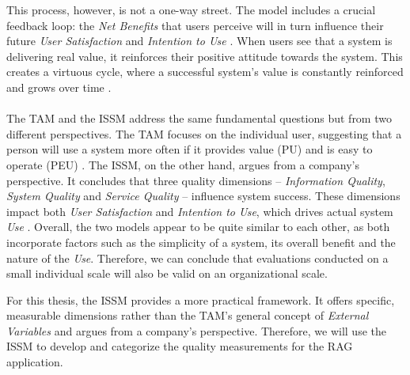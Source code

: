 \documentclass[
	english,
	ruledheaders=section,%
	class=report,%
	thesis={type=bachelor},%
	accentcolor=1b,%
	custommargins=true,%
	marginpar=false,%
	parskip=half-,%
	fontsize=11pt,%
	DIV=14,
]{tudapub}
\begin{document}
This process, however, is not a one-way street. The model includes a crucial feedback loop: the \textit{Net Benefits} that users perceive will in turn influence their future \textit{User Satisfaction} and \textit{Intention to Use} \parencite[p.~23-24]{DeloneMcLean2003ISSuccessTenYearUpdate}. When users see that a system is delivering real value, it reinforces their positive attitude towards the system. This creates a virtuous cycle, where a successful system's value is constantly reinforced and grows over time \parencite[p.~23]{DeloneMcLean2003ISSuccessTenYearUpdate}.\\
\\
The TAM and the ISSM address the same fundamental questions but from two different perspectives. The TAM focuses on the individual user, suggesting that a person will use a system more often if it provides value (PU) and is easy to operate (PEU) \parencite[p.~320]{Davis1989}.
The ISSM, on the other hand, argues from a company's perspective. It concludes that three quality dimensions -- \textit{Information Quality}, \textit{System Quality} and \textit{Service Quality} -- influence system success. These dimensions impact both \textit{User Satisfaction} and \textit{Intention to Use}, which drives actual system \textit{Use} \parencite[pp.~22-23]{DeloneMcLean2003ISSuccessTenYearUpdate}. Overall, the two models appear to be quite similar to each other, as both incorporate factors such as the simplicity of a system, its overall benefit and the nature of the \textit{Use}. Therefore, we can conclude that evaluations conducted on a small individual scale will also be valid on an organizational scale.

For this thesis, the ISSM provides a more practical framework. It offers specific, measurable dimensions rather than the TAM's general concept of \textit{External Variables} and argues from a company's perspective. Therefore, we will use the ISSM to develop and categorize the quality measurements for the RAG application.
\newpage
\end{document}
